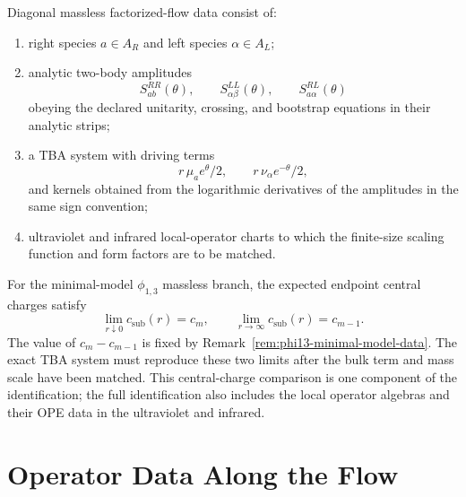 \begin{definition}
\label{def:massless-factorized-flow-data}
Diagonal massless factorized-flow data consist of:
\begin{enumerate}
\item right species \(a\in A_R\) and left species \(\alpha\in A_L\);
\item analytic two-body amplitudes
\[
  S^{RR}_{ab}(\theta),\qquad
  S^{LL}_{\alpha\beta}(\theta),\qquad
  S^{RL}_{a\alpha}(\theta)
\]
obeying the declared unitarity, crossing, and bootstrap equations in their
analytic strips;
\item a TBA system with driving terms
\[
  r\,\mu_a e^\theta/2,\qquad r\,\nu_\alpha e^{-\theta}/2,
\]
and kernels obtained from the logarithmic derivatives of the amplitudes in
the same sign convention;
\item ultraviolet and infrared local-operator charts to which the finite-size
scaling function and form factors are to be matched.
\end{enumerate}
\end{definition}

For the minimal-model \(\phi_{1,3}\) massless branch, the expected endpoint
central charges satisfy
\[
  \lim_{r\downarrow0}c_{\mathrm{sub}}(r)=c_m,\qquad
  \lim_{r\to\infty}c_{\mathrm{sub}}(r)=c_{m-1}.
\]
The value of \(c_m-c_{m-1}\) is fixed by
Remark~\ref{rem:phi13-minimal-model-data}.  The exact TBA system must
reproduce these two limits after the bulk term and mass scale have been
matched.  This central-charge comparison is one component of the
identification; the full identification also includes the local operator
algebras and their OPE data in the ultraviolet and infrared.

\section{Operator Data Along the Flow}


